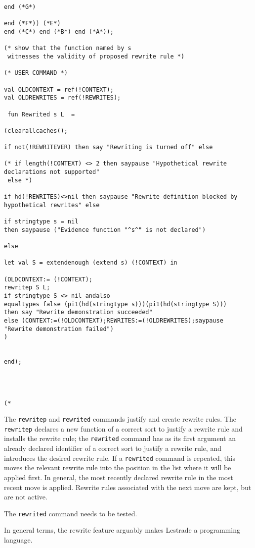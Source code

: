 \documentclass{article}
\begin{document}
\begin{verbatim}
end (*G*)

end (*F*)) (*E*)
end (*C*) end (*B*) end (*A*));

(* show that the function named by s
 witnesses the validity of proposed rewrite rule *)

(* USER COMMAND *)

val OLDCONTEXT = ref(!CONTEXT);
val OLDREWRITES = ref(!REWRITES);

 fun Rewrited s L  =

(clearallcaches();

if not(!REWRITEVER) then say "Rewriting is turned off" else

(* if length(!CONTEXT) <> 2 then saypause "Hypothetical rewrite declarations not supported"
 else *)

if hd(!REWRITES)<>nil then saypause "Rewrite definition blocked by hypothetical rewrites" else

if stringtype s = nil 
then saypause ("Evidence function "^s^" is not declared")

else 

let val S = extendenough (extend s) (!CONTEXT) in

(OLDCONTEXT:= (!CONTEXT);
rewritep S L;
if stringtype S <> nil andalso
equaltypes false (pi1(hd(stringtype s)))(pi1(hd(stringtype S)))
then say "Rewrite demonstration succeeded"
else (CONTEXT:=(!OLDCONTEXT);REWRITES:=(!OLDREWRITES);saypause "Rewrite demonstration failed")
)


end);




(*

\end{verbatim}

The {\tt rewritep} and {\tt rewrited} commands justify and create rewrite rules.  The {\tt rewritep} declares a new function of a correct sort
to justify a rewrite rule and installs the rewrite rule;  the {\tt rewrited} command has as its first argument an already declared identifier of a correct sort to justify a rewrite rule, and introduces the desired rewrite rule.  If a {\tt rewrited} command is repeated, this moves the relevant rewrite rule into the position in the list where it will be applied first.  In general, the most recently declared rewrite rule in the most recent move is applied.  Rewrite rules
associated with the next move are kept, but are not active.

The {\tt rewrited} command needs to be tested.

In general terms, the rewrite feature arguably makes Lestrade a programming language.
\end{document}
